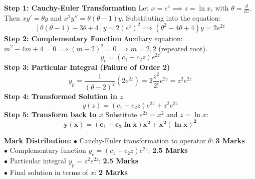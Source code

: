 \begin{solutionbox}
\textbf{Step 1: Cauchy-Euler Transformation}
Let $x = e^z \implies z = \ln x$, with $\theta = \frac{d}{dz}$.
Then $x y' = \theta y$ and $x^2 y'' = \theta(\theta - 1)y$.
Substituting into the equation:
\[
[\theta(\theta - 1) - 3\theta + 4]y = 2(e^z)^2 \implies (\theta^2 - 4\theta + 4)y = 2e^{2z}
\]
\textbf{Step 2: Complementary Function}
Auxiliary equation: $m^2 - 4m + 4 = 0 \implies (m - 2)^2 = 0 \implies m = 2, 2$ (repeated root).
\[
y_c = (c_1 + c_2 z)e^{2z}
\]
\textbf{Step 3: Particular Integral (Failure of Order 2)}
\[
y_p = \frac{1}{(\theta - 2)^2} (2e^{2z}) = 2 \frac{z^2}{2!} e^{2z} = z^2 e^{2z}
\]
\textbf{Step 4: Transformed Solution in $z$}
\[
y(z) = (c_1 + c_2 z)e^{2z} + z^2 e^{2z}
\]
\textbf{Step 5: Transform back to $x$}
Substitute $e^{2z} = x^2$ and $z = \ln x$:
\[
\mathbf{y(x) = (c_1 + c_2 \ln x)x^2 + x^2 (\ln x)^2}
\]

\begin{markingrubric}
\textbf{Mark Distribution:}
$\bullet$ Cauchy-Euler transformation to operator $\theta$: \textbf{3 Marks}\\
$\bullet$ Complementary function $y_c = (c_1 + c_2 z)e^{2z}$: \textbf{2.5 Marks}\\
$\bullet$ Particular integral $y_p = z^2 e^{2z}$: \textbf{2.5 Marks}\\
$\bullet$ Final solution in terms of $x$: \textbf{2 Marks}
\end{markingrubric}
\end{solutionbox}

